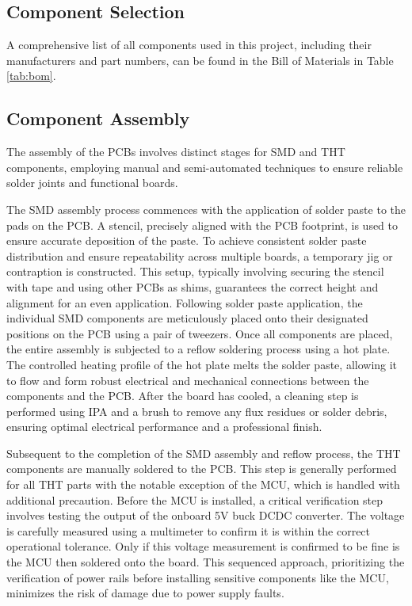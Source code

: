 \subsection{Component Selection}
A comprehensive list of all components used in this project, including their manufacturers and part numbers, can be found in the Bill of Materials in Table \ref{tab:bom}.

\subsection{Component Assembly}\label{sec:component_assembly}
The assembly of the \ac{PCB}s involves distinct stages for \ac{SMD} and \ac{THT} components, employing manual and semi-automated techniques to ensure reliable solder joints and functional boards. \\

\begin{description}[style=nextline]
	\item[\ac{SMD}] The \ac{SMD} assembly process commences with the application of solder paste to the pads on the \ac{PCB}. A stencil, precisely aligned with the \ac{PCB} footprint, is used to ensure accurate deposition of the paste. To achieve consistent solder paste distribution and ensure repeatability across multiple boards, a temporary jig or contraption is constructed. This setup, typically involving securing the stencil with tape and using other \ac{PCB}s as shims, guarantees the correct height and alignment for an even application. Following solder paste application, the individual \ac{SMD} components are meticulously placed onto their designated positions on the \ac{PCB} using a pair of tweezers. Once all components are placed, the entire assembly is subjected to a reflow soldering process using a hot plate. The controlled heating profile of the hot plate melts the solder paste, allowing it to flow and form robust electrical and mechanical connections between the components and the \ac{PCB}. After the board has cooled, a cleaning step is performed using \ac{IPA} and a brush to remove any flux residues or solder debris, ensuring optimal electrical performance and a professional finish.
	
	\item[\ac{THT}] Subsequent to the completion of the \ac{SMD} assembly and reflow process, the \ac{THT} components are manually soldered to the \ac{PCB}. This step is generally performed for all \ac{THT} parts with the notable exception of the \ac{MCU}, which is handled with additional precaution. Before the \ac{MCU} is installed, a critical verification step involves testing the output of the onboard 5V buck \ac{DCDC} converter. The voltage is carefully measured using a multimeter to confirm it is within the correct operational tolerance. Only if this voltage measurement is confirmed to be fine is the \ac{MCU} then soldered onto the board. This sequenced approach, prioritizing the verification of power rails before installing sensitive components like the \ac{MCU}, minimizes the risk of damage due to power supply faults.
\end{description}
